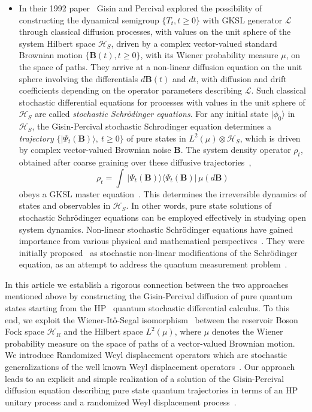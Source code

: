 \begin{itemize}
\item In their 1992 paper~\cite{key9} Gisin and Percival explored the possibility of constructing the dynamical semigroup $\{T_t,t\geq 0\}$ with GKSL generator $\mathcal{L}$ through classical diffusion processes, with  values on the unit sphere of the system Hilbert space $\mathcal{H}_S$, driven by a complex vector-valued standard Brownian motion $\{\mathbf{B}(t), t\geq 0\}$, with its Wiener probability measure $\mu$, on the space of paths. They arrive at a non-linear diffusion equation on the unit sphere involving the differentials $d\mathbf{B}(t)$ and $dt$, with diffusion and drift coefficients depending on the operator parameters describing $\mathcal{L}$. Such classical stochastic differential equations for processes with values in the unit sphere of $\mathcal{H}_S$ are called {\it stochastic Schr{\"o}dinger equations}.  For any initial state $\vert \phi_0\rangle$ in $\mathcal{H}_S$, the Gisin-Percival stochastic Schrodinger equation determines a {\it trajectory}   
$\{\vert\Psi_t(\mathbf{B})\rangle,\ t\geq 0\}$ of pure states in $L^2(\mu)\otimes \mathcal{H}_S$, which is driven by complex vector-valued Brownian noise $\mathbf{B}$. The system density operator $\rho_t$, obtained after coarse graining over these diffusive trajectories~\cite{key10},
$$
\rho_t=\int\, \vert \Psi_t(\mathbf{B})\rangle\langle \Psi_t(\mathbf{B})\vert\, \mu(d\mathbf{B})
$$
 obeys a GKSL master equation~\cite{key1,key2}. This determines the irreversible dynamics of states and observables in $\mathcal{H}_S$. In other words, pure state solutions of stochastic Schr{\"o}dinger equations can be  employed   effectively in studying open system dynamics.  Non-linear stochastic Schr{\"o}dinger equations have gained importance from various physical and mathematical  perspectives~\cite{key9,key10,key11,key12,key13,key14,key15,key16,key17,key18,key19,key20,key21,key22,key23,key24,key25,key26,key27,key28}. They were initially proposed~\cite{key15} as  stochastic non-linear modifications of the Schr{\"o}dinger equation, as an attempt to address the quantum measurement problem~\cite{key10,key11,key12,key13,key14,key15, key17, key22,key23,key24, key27,key28,key29,key30,key31}. 
\end{itemize}

In this article we establish a rigorous connection between the two approaches mentioned above by constructing the Gisin-Percival diffusion of pure quantum states starting from the HP~\cite{key7, key8}  quantum stochastic differential calculus. To this end, we exploit the Wiener-It{\^o}-Segal isomorphism~\cite{key32,key33,key34} between the reservoir Boson Fock space $\mathcal{H}_R$ and the Hilbert space $L^2(\mu)$, where $\mu$ denotes the Wiener probability measure on the space of paths of a vector-valued Brownian motion. We introduce Randomized Weyl displacement operators which are stochastic generalizations of the well known Weyl displacement operators~\cite{key8}.  Our approach leads to an explicit and simple realization of a solution of the Gisin-Percival diffusion equation  describing pure state quantum trajectories in terms of an HP unitary process and a randomized Weyl displacement process~\cite{key35}. 

